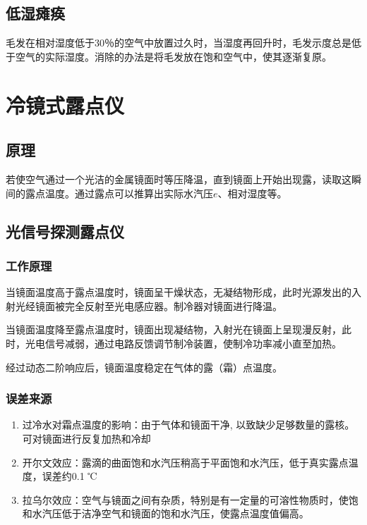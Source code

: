 \documentclass[UTF8,11pt]{ctexbook}
\begin{document}
\subsection{低湿瘫痪}

毛发在相对湿度低于30％的空气中放置过久时，当湿度再回升时，毛发示度总是低于空气的实际湿度。消除的办法是将毛发放在饱和空气中，使其逐渐复原。


\section{冷镜式露点仪}

\subsection{原理}

若使空气通过一个光洁的金属镜面时等压降温，直到镜面上开始出现露，读取这瞬间的露点温度。通过露点可以推算出实际水汽压\(e\)、相对湿度等。

\subsection{光信号探测露点仪}

\subsubsection{工作原理}

当镜面温度高于露点温度时，镜面呈干燥状态，无凝结物形成，此时光源发出的入射光经镜面被完全反射至光电感应器。制冷器对镜面进行降温。

当镜面温度降至露点温度时，镜面出现凝结物，入射光在镜面上呈现漫反射，此时，光电信号减弱，通过电路反馈调节制冷装置，使制冷功率减小直至加热。

经过动态二阶响应后，镜面温度稳定在气体的露（霜）点温度。

\subsubsection{误差来源}
\begin{enumerate}
    \item 过冷水对霜点温度的影响：由于气体和镜面干净, 以致缺少足够数量的露核。可对镜面进行反复加热和冷却
    \item 开尔文效应：露滴的曲面饱和水汽压稍高于平面饱和水汽压，低于真实露点温度，误差约0.1 ℃
    \item 拉乌尔效应：空气与镜面之间有杂质，特别是有一定量的可溶性物质时，使饱和水汽压低于洁净空气和镜面的饱和水汽压，使露点温度值偏高。
\end{enumerate}
\end{document}
